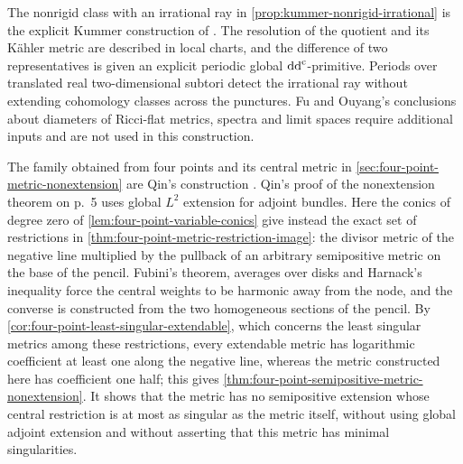 The nonrigid class with an irrational ray in \cref{prop:kummer-nonrigid-irrational} is the explicit Kummer construction of \cite[v1, Section~7.1, pp.~18--19, proof of Theorem~1.4(a)]{FuOuyang26}. The resolution of the quotient and its K\"ahler metric are described in local charts, and the difference of two representatives is given an explicit periodic global $\mathrm{dd}^{\mathrm{c}}$-primitive. Periods over translated real two-dimensional subtori detect the irrational ray without extending cohomology classes across the punctures. Fu and Ouyang's conclusions about diameters of Ricci-flat metrics, spectra and limit spaces require additional inputs and are not used in this construction.

The family obtained from four points and its central metric in \cref{sec:four-point-metric-nonextension} are Qin's construction \cite[v1, Theorem~A, p.~1, and Section~3, Lemmas~3.1--3.3, pp.~3--4]{QinMetricExtension26}. Qin's proof of the nonextension theorem on p.~5 uses global $L^2$ extension for adjoint bundles. Here the conics of degree zero of \cref{lem:four-point-variable-conics} give instead the exact set of restrictions in \cref{thm:four-point-metric-restriction-image}: the divisor metric of the negative line multiplied by the pullback of an arbitrary semipositive metric on the base of the pencil. Fubini's theorem, averages over disks and Harnack's inequality force the central weights to be harmonic away from the node, and the converse is constructed from the two homogeneous sections of the pencil. By \cref{cor:four-point-least-singular-extendable}, which concerns the least singular metrics among these restrictions, every extendable metric has logarithmic coefficient at least one along the negative line, whereas the metric constructed here has coefficient one half; this gives \cref{thm:four-point-semipositive-metric-nonextension}. It shows that the metric has no semipositive extension whose central restriction is at most as singular as the metric itself, without using global adjoint extension and without asserting that this metric has minimal singularities.

